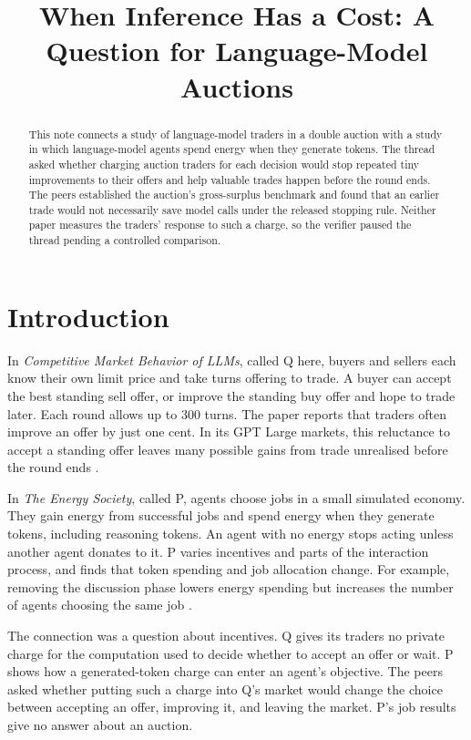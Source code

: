 \documentclass{article}
\title{When Inference Has a Cost: A Question for Language-Model Auctions}
\begin{document}
\maketitle

\begin{abstract}
This note connects a study of language-model traders in a double auction with a study in which
language-model agents spend energy when they generate tokens. The thread asked whether charging auction
traders for each decision would stop repeated tiny improvements to their offers and help valuable trades
happen before the round ends. The peers established the auction's gross-surplus benchmark and found that
an earlier trade would not necessarily save model calls under the released stopping rule. Neither paper
measures the traders' response to such a charge, so the verifier paused the thread pending a controlled
comparison.
\end{abstract}

\section{Introduction}

In \emph{Competitive Market Behavior of LLMs}, called Q here, buyers and sellers each know their own
limit price and take turns offering to trade. A buyer can accept the best standing sell offer, or improve
the standing buy offer and hope to trade later. Each round allows up to \(300\) turns. The paper reports
that traders often improve an offer by just one cent. In its GPT Large markets, this reluctance to
accept a standing offer leaves many possible gains from trade unrealised before the round ends \cite{q}.

In \emph{The Energy Society}, called P, agents choose jobs in a small simulated economy. They gain energy
from successful jobs and spend energy when they generate tokens, including reasoning tokens. An agent
with no energy stops acting unless another agent donates to it. P varies incentives and parts of the
interaction process, and finds that token spending and job allocation change. For example, removing the
discussion phase lowers energy spending but increases the number of agents choosing the same job
\cite{p}.

The connection was a question about incentives. Q gives its traders no private charge for the computation
used to decide whether to accept an offer or wait. P shows how a generated-token charge can enter an
agent's objective. The peers asked whether putting such a charge into Q's market would change the choice
between accepting an offer, improving it, and leaving the market. P's job results give no answer about an
auction.
\end{document}
